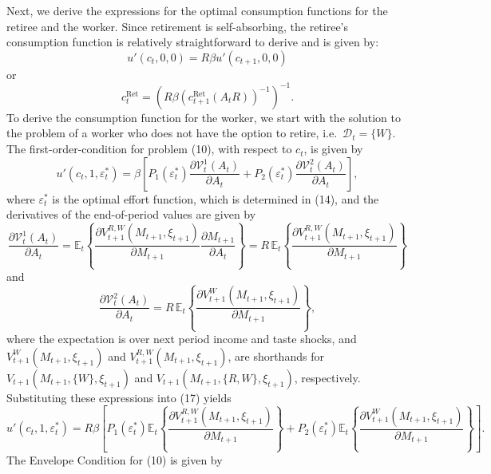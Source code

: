 \documentclass[11pt]{article}
\newcommand{\Ret}{\mathrm{Ret}}
\newcommand{\eff}{\varepsilon}
\newcommand{\goth}[1]{\mathcal{#1}}   %
\newcommand{\E}{\mathbb{E}}
\begin{document}
Next, we derive the expressions for the optimal consumption functions for the retiree
and the worker. Since retirement is self-absorbing, the retiree's consumption function
is relatively straightforward to derive and is given by:
\begin{equation}
u'(c_t, 0, 0) = R \beta u'(c_{t+1}, 0, 0)
\end{equation}
or
\begin{equation}
c_t^{\Ret} = \left( R \beta \left( c_{t+1}^{\Ret}(A_t R) \right)^{-1} \right)^{-1}.
\end{equation}
To derive the consumption function for the worker, we start with the solution to the
problem of a worker who does not have the option to retire, i.e.\ $\mathcal{D}_t = \{W\}$. The
first-order-condition for problem (10), with respect to $c_t$, is given by
\begin{equation}
u'(c_t, 1, \eff_t^*) = \beta \left[
P_1(\eff_t^*) \frac{\partial \goth{V}_t^1(A_t)}{\partial A_t}
+ P_2(\eff_t^*) \frac{\partial \goth{V}_t^2(A_t)}{\partial A_t}
\right],
\end{equation}
where $\eff_t^*$ is the optimal effort function, which is determined in (14), and the derivatives
of the end-of-period values are given by
\begin{equation}
\frac{\partial \goth{V}_t^1(A_t)}{\partial A_t}
= \E_t \left\{ \frac{\partial V_{t+1}^{R,W}(M_{t+1}, \xi_{t+1})}{\partial M_{t+1}}
\frac{\partial M_{t+1}}{\partial A_t} \right\}
= R\, \E_t \left\{ \frac{\partial V_{t+1}^{R,W}(M_{t+1}, \xi_{t+1})}{\partial M_{t+1}} \right\}
\end{equation}
and
\begin{equation}
\frac{\partial \goth{V}_t^2(A_t)}{\partial A_t}
= R\, \E_t \left\{ \frac{\partial V_{t+1}^{W}(M_{t+1}, \xi_{t+1})}{\partial M_{t+1}} \right\},
\end{equation}
where the expectation is over next period income and taste shocks, and $V_{t+1}^{W}(M_{t+1}, \xi_{t+1})$
and $V_{t+1}^{R,W}(M_{t+1}, \xi_{t+1})$, are shorthands for $V_{t+1}(M_{t+1}, \{W\}, \xi_{t+1})$ and $V_{t+1}(M_{t+1}, \{R, W\}, \xi_{t+1})$,
respectively. Substituting these expressions into (17) yields
\begin{equation}
u'(c_t, 1, \eff_t^*) = R \beta \left[
P_1(\eff_t^*) \E_t \left\{ \frac{\partial V_{t+1}^{R,W}(M_{t+1}, \xi_{t+1})}{\partial M_{t+1}} \right\}
+ P_2(\eff_t^*) \E_t \left\{ \frac{\partial V_{t+1}^{W}(M_{t+1}, \xi_{t+1})}{\partial M_{t+1}} \right\}
\right].
\end{equation}
The Envelope Condition for (10) is given by
\end{document}
